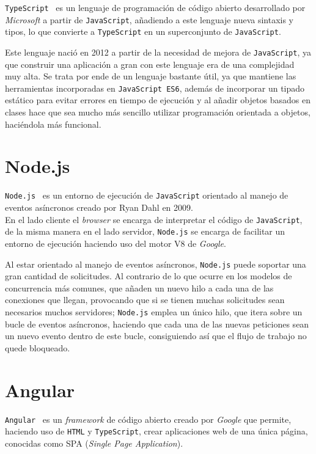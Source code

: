 \documentclass[a4paper, 12pt]{book}
\begin{document}
\texttt{TypeScript}~\cite{typescript} es un lenguaje de programación de código abierto desarrollado por \textit{Microsoft} a partir de \texttt{JavaScript}, añadiendo a este lenguaje nueva sintaxis y tipos, lo que convierte a \texttt{TypeScript} en un superconjunto de \texttt{JavaScript}.

Este lenguaje nació en 2012 a partir de la necesidad de mejora de \texttt{JavaScript}, ya que construir una aplicación a gran con este lenguaje era de una complejidad muy alta. Se trata por ende de un lenguaje bastante útil, ya que mantiene las herramientas incorporadas en \texttt{JavaScript ES6}, además de incorporar un tipado estático para evitar errores en tiempo de ejecución y al añadir objetos basados en clases hace que sea mucho más sencillo utilizar programación orientada a objetos, haciéndola más funcional.

\section{Node.js}
\label{sec:nodejs}

\texttt{Node.js}~\cite{nodejs} es un entorno de ejecución de \texttt{JavaScript} orientado al manejo de eventos asíncronos creado por Ryan Dahl en 2009.\\
En el lado cliente el \textit{browser} se encarga de interpretar el código de \texttt{JavaScript}, de la misma manera en el lado servidor, \texttt{Node.js} se encarga de facilitar un entorno de ejecución haciendo uso del motor V8 de \textit{Google}.

Al estar orientado al manejo de eventos asíncronos, \texttt{Node.js} puede soportar una gran cantidad de solicitudes. Al contrario de lo que ocurre en los modelos de concurrencia más comunes, que añaden un nuevo hilo a cada una de las conexiones que llegan, provocando que si se tienen muchas solicitudes sean necesarios muchos servidores; \texttt{Node.js} emplea un único hilo, que itera sobre un bucle de eventos asíncronos, haciendo que cada una de las nuevas peticiones sean un nuevo evento dentro de este bucle, consiguiendo así que el flujo de trabajo no quede bloqueado.

\section{Angular}
\label{sec:angular}

\texttt{Angular}~\cite{angularjs} es un \textit{framework} de código abierto creado por \textit{Google} que permite, haciendo uso de \texttt{HTML} y \texttt{TypeScript}, crear aplicaciones web de una única página, conocidas como SPA (\textit{Single Page Application}).
\end{document}
